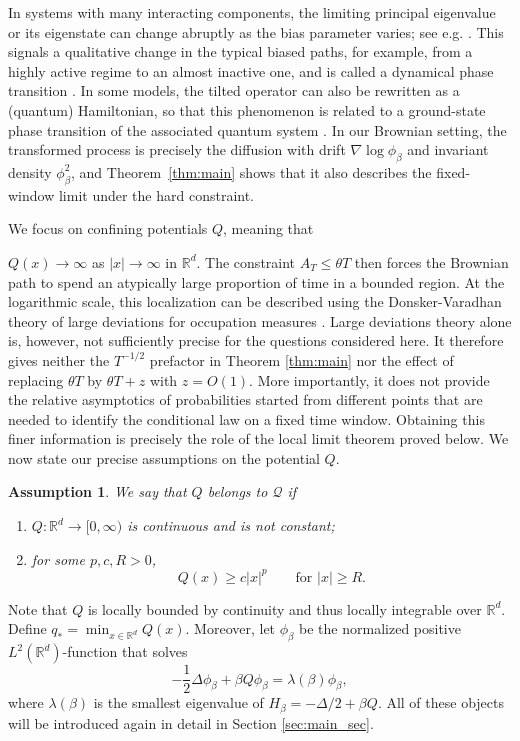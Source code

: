 \documentclass[11pt,reqno]{amsart}
\newtheorem{assumption}[theorem]{Assumption}
\theoremstyle{definition}
\numberwithin{equation}{section}
\newcommand{\<}{\langle}
\renewcommand{\>}{\rangle}
\def\cQ{{\mathcal{Q}}}
\begin{document}
In systems with many interacting components, the limiting principal eigenvalue or its eigenstate can change abruptly as the bias parameter varies; see e.g. \cite{BeSchSe24}. This signals a qualitative change in the typical biased paths, for example, from a highly active regime to an almost inactive one, and is called a dynamical phase transition \cite{LecomteEtAl2007,GarrahanEtAl2007,Jack2020}. In some models, the tilted operator can also be rewritten as a (quantum) Hamiltonian, so that this phenomenon is related to a ground-state phase transition of the associated quantum system \cite{JackSollich2010}. In our Brownian setting, the transformed process is precisely the diffusion with drift  $\nabla\log\phi_\beta $ and invariant density  $\phi_\beta^2 $, and Theorem~\ref{thm:main} shows that it also describes the fixed-window limit under the hard constraint.

We focus on confining potentials  $Q $, meaning that
 
 $Q(x)\to\infty $ as  $\lvert x\rvert\to\infty $ in $\mathbb R^d$. The constraint
 $A_T\leq \theta T $ then forces the Brownian path to spend an
atypically large proportion of time in a bounded region. At the
logarithmic scale, this localization can be described using the
Donsker-Varadhan theory of large deviations for occupation measures
\cite{DV75a,DV75b}. 
Large deviations theory alone is, however, not sufficiently precise
for the questions considered here. 
It therefore gives neither the  $T^{-1/2} $ prefactor
in Theorem \ref{thm:main} nor the effect of replacing  $\theta T $ by
 $\theta T+z $ with  $z=O(1) $. More importantly, it does not provide
the relative asymptotics of probabilities started from different
points that are needed to identify the conditional law on a fixed
time window. Obtaining this finer information is precisely the role
of the local limit theorem proved below.
We now state our precise assumptions on the potential $Q$.

\begin{assumption}\label{def:classQ}
We say that $Q$ belongs to $\cQ$ if
\begin{enumerate}
  
 \item $Q:\mathbb R^d \to [0,\infty)$ is continuous and is not constant;
 \item for some $p,c,R>0$, \label{bp:ass_2}
       \[
       Q(x)\geq c|x|^p \qquad \text{for $|x| \ge R$}.
       \]
\end{enumerate}
\end{assumption}
Note that $Q$ is locally bounded by continuity and thus locally integrable over $\mathbb R^d$. Define $q_* = \min_{x\in\mathbb R^d}Q(x)$. Moreover, let $\phi_\beta$ be the normalized positive $L^2(\mathbb R^d)$-function that solves
\[
    -\frac12\Delta\phi_\beta+\beta Q\phi_\beta
    =\lambda(\beta)\phi_\beta,
\]
where $\lambda(\beta)$ is the smallest eigenvalue of $H_\beta=-\Delta/2+\beta Q$. All of these objects will be introduced again in detail in Section \ref{sec:main_sec}.
\end{document}
